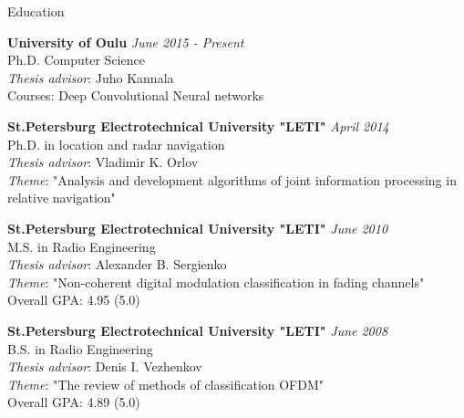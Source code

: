 \documentclass{resume} %
\begin{document}

\begin{rSection}{Education}

{\bf University of Oulu} \hfill {\em June 2015 - Present}  \\ 
Ph.D. Computer Science \\
{\it Thesis advisor}: Juho Kannala \\
Courses: Deep Convolutional Neural networks \smallskip

{\bf St.Petersburg Electrotechnical University "LETI"} \hfill {\em April 2014} \\ 
Ph.D. in location and radar navigation \\
{\it Thesis advisor}: Vladimir K. Orlov \\
{\it Theme}: "Analysis and development algorithms of joint information processing in relative navigation" \smallskip

{\bf St.Petersburg Electrotechnical University "LETI"} \hfill {\em June 2010} \\ 
M.S. in  Radio Engineering \\
{\it Thesis advisor}: Alexander B. Sergienko \\
{\it Theme}: "Non-coherent digital modulation classification in fading channels" \\
Overall GPA: 4.95 (5.0) \smallskip

{\bf St.Petersburg Electrotechnical University "LETI"} \hfill {\em June 2008} \\ 
B.S. in  Radio Engineering \\
{\it Thesis advisor}: Denis I. Vezhenkov \\
{\it Theme}: "The review of methods of classification OFDM" \\
Overall GPA: 4.89 (5.0) \smallskip

\end{rSection}

\end{document}
